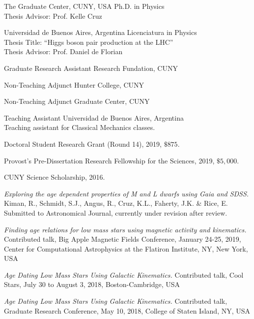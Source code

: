\documentclass[10pt]{cv}
\begin{document}
\begin{llist}

The Graduate Center, CUNY, USA
Ph.D. in Physics\\
Thesis Advisor: Prof. Kelle Cruz

Universidad de Buenos Aires, Argentina
Licenciatura in Physics\\
Thesis Title: ``Higgs boson pair production at the LHC''\\
Thesis Advisor: Prof. Daniel de Florian


Graduate Research Assistant
Research Fundation, CUNY

Non-Teaching Adjunct
Hunter College, CUNY

Non-Teaching Adjunct
Graduate Center, CUNY

Teaching Assistant
Universidad de Buenos Aires, Argentina\\
Teaching assistant for Classical Mechanics classes.


Doctoral Student Research Grant (Round 14), 2019, $\$875$.

Provost’s Pre-Dissertation Research Fellowship for the Sciences, 2019, $\$5,000$.

CUNY Science Scholarship, 2016.


\textit{Exploring the age dependent properties of M and L dwarfs using \textit{Gaia} and SDSS.} Kiman, R., Schmidt, S.J., Angus, R., Cruz, K.L., Faherty, J.K. \& Rice, E. Submitted to Astronomical Journal, currently under revision after review.



\textit{Finding age relations for low mass stars using magnetic activity and kinematics.} Contributed talk, Big Apple Magnetic Fields Conference, January 24-25, 2019, Center for Computational Astrophysics at the Flatiron Institute, NY, New York, USA 

\textit{Age Dating Low Mass Stars Using Galactic Kinematics.} Contributed talk, Cool Stars, July 30 to August 3, 2018, Boston-Cambridge, USA

\textit{Age Dating Low Mass Stars Using Galactic Kinematics.} Contributed talk, Graduate Research Conference, May 10, 2018, College of Staten Island, NY, USA


\end{llist}
\end{document}
